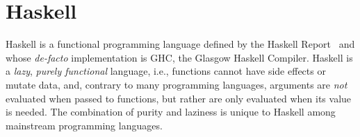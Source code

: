 \documentclass[]{lwnovathesis}
\newcommand{\mypara}[1]{\paragraph{\textbf{#1}.}}
\newcommand{\lolli}{\multimap}
\newcommand{\bang}{{!}}
\newcommand{\llet}[2]{\mathsf{let}~#1~\mathsf{in}~#2}
\begin{document}







\section{Haskell}

Haskell is a functional programming language defined by the Haskell
Report~\cite{jones1999haskell,marlow2010haskell} and whose \emph{de-facto}
implementation is GHC, the Glasgow Haskell Compiler\cite{GHC}. Haskell is a
\emph{lazy}, \emph{purely functional} language, i.e., functions cannot
have side effects or mutate data, and, contrary to many programming languages,
arguments are \emph{not} evaluated when passed to functions, but rather are only
evaluated when its value is needed. The combination of purity and laziness is
unique to Haskell among mainstream programming languages.
\end{document}
